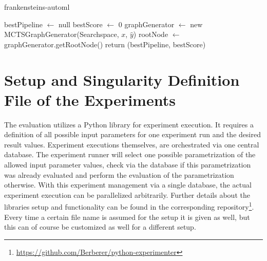 \begin{algorithm}[H]
    \caption{frankensteins-automl}
    \SetAlgoLined
    \DontPrintSemicolon
    \BlankLine
    bestPipeline $\leftarrow$ null\;
    bestScore $\leftarrow$ 0\;
    graphGenerator $\leftarrow$ new MCTSGraphGenerator(Searchspace, $x$, $\hat{y}$)\;
    rootNode $\leftarrow$ graphGenerator.getRootNode()\;
    return (bestPipeline, bestScore)\;
\end{algorithm}

\section{Setup and Singularity Definition File of the Experiments}
\label{sec:appendix:singularity}
The evaluation utilizes a Python library for experiment execution.
It requires a definition of all possible input parameters for one experiment run and the desired result values.\newline
Experiment executions themselves, are orchestrated via one central database.
The experiment runner will select one possible parametrization of the allowed input parameter values, check via the database if this parametrization was already evaluated and perform the evaluation of the parametrization otherwise.
With this experiment management via a single database, the actual experiment execution can be parallelized arbitrarily.
Further details about the libraries setup and functionality can be found in the corresponding repository\footnote{\url{https://github.com/Berberer/python-experimenter}}.\newline
Every time a certain file name is assumed for the setup it is given as well, but this can of course be customized as well for a different setup.

